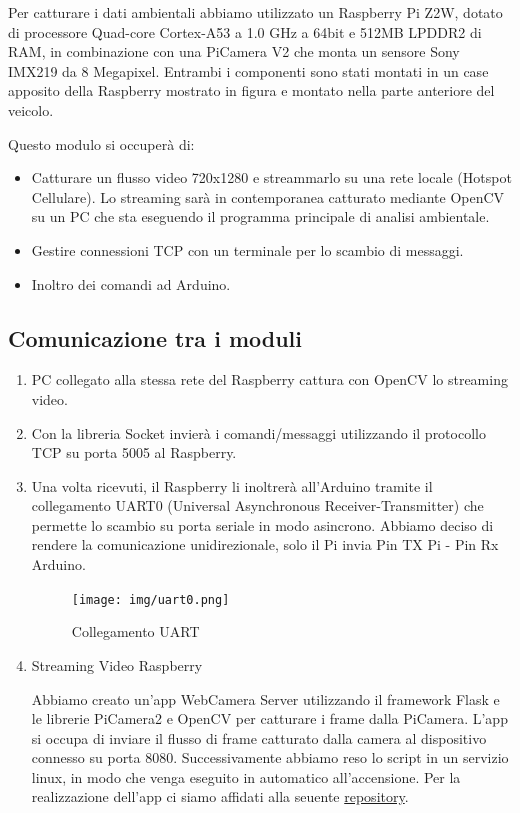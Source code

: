 \documentclass{article}
\begin{document}
 Per catturare i dati ambientali abbiamo utilizzato un Raspberry Pi Z2W, dotato di processore Quad-core Cortex-A53 a 1.0 GHz a 64bit e 512MB LPDDR2 di RAM, in combinazione con una \cite{picamera} PiCamera V2 che monta un sensore Sony IMX219 da 8 Megapixel. Entrambi i componenti sono stati montati in un case apposito della Raspberry mostrato in figura e montato nella parte anteriore del veicolo.

Questo modulo si occuperà di:
\begin{itemize}
\item Catturare un flusso video 720x1280 e streammarlo su una rete locale (Hotspot Cellulare). Lo streaming sarà in contemporanea catturato mediante OpenCV su un PC che sta eseguendo il programma principale di analisi ambientale.
\item Gestire connessioni TCP con un terminale per lo scambio di messaggi.
\item Inoltro dei comandi ad Arduino.
\end{itemize}

\subsection{Comunicazione tra i moduli}
\begin{enumerate}
\item PC collegato alla stessa rete del Raspberry cattura con OpenCV lo streaming video.
\item  Con la libreria Socket invierà i comandi/messaggi utilizzando il protocollo TCP su porta 5005 al Raspberry.
\item Una volta ricevuti, il Raspberry li inoltrerà all'Arduino tramite il collegamento UART0 (Universal Asynchronous Receiver-Transmitter) che permette lo scambio su porta seriale in modo asincrono. Abbiamo deciso di rendere la comunicazione unidirezionale, solo il Pi invia Pin TX Pi - Pin Rx Arduino.  
\begin{figure}[h!]
  \centering
  \texttt{[image: img/uart0.png]}
    \caption{Collegamento UART}
\end{figure}

\item \cite{flaskstream} Streaming Video Raspberry

    Abbiamo creato un'app WebCamera Server utilizzando il framework Flask e le librerie PiCamera2 e OpenCV per catturare i frame dalla PiCamera. L'app si occupa di inviare il flusso di frame catturato dalla camera al dispositivo connesso su porta 8080.
    Successivamente abbiamo reso lo script in un servizio linux, in modo che venga eseguito in automatico all'accensione. Per la realizzazione dell'app ci siamo affidati alla seuente \href{https://github.com/miguelgrinberg/flask-video-streaming/tree/v1}{repository}. 
\end{enumerate}
\end{document}
